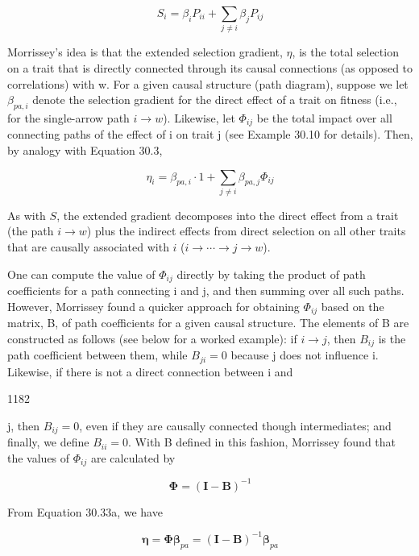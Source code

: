 \documentclass{article}
\begin{document}
\begin{equation}
S_{i}=\beta_{i}P_{ii}+\sum_{j\neq i}\beta_{j}P_{ij}
\end{equation}

Morrissey’s idea is that the extended selection gradient,  $ \eta $, is the total selection on a trait that is directly connected through its causal connections (as opposed to correlations) with w. For a given causal structure (path diagram), suppose we let  $ \beta_{pa,i} $ denote the selection gradient for the direct effect of a trait on fitness (i.e., for the single-arrow path  $ i \to w $). Likewise, let  $ \Phi_{ij} $ be the total impact over all connecting paths of the effect of i on trait j (see Example 30.10 for details). Then, by analogy with Equation 30.3,

\begin{equation}
\eta_{i}=\beta_{pa,i}\cdot1+\sum_{j\neq i}\beta_{pa,j}\Phi_{ij}
\tag{30.33a}
\label{eq:30_33a}
\end{equation}

As with $S$, the extended gradient decomposes into the direct effect from a trait (the path $i \to w$) plus the indirect effects from direct selection on all other traits that are causally associated with $i$ ($i \to \cdots \to j \to w$).

One can compute the value of  $ \Phi_{ij} $ directly by taking the product of path coefficients for a path connecting i and j, and then summing over all such paths. However, Morrissey found a quicker approach for obtaining  $ \Phi_{ij} $ based on the matrix, B, of path coefficients for a given causal structure. The elements of B are constructed as follows (see below for a worked example): if  $ i \rightarrow j $, then  $ B_{ij} $ is the path coefficient between them, while  $ B_{ji} = 0 $ because j does not influence i. Likewise, if there is not a direct connection between i and

1182

j, then  $ B_{ij} = 0 $, even if they are causally connected though intermediates; and finally, we define  $ B_{ii} = 0 $. With B defined in this fashion, Morrissey found that the values of  $ \Phi_{ij} $ are calculated by

\begin{equation}
\boldsymbol{\Phi}=(\mathbf{I}-\mathbf{B})^{-1}
\tag{30.33b}
\label{eq:30_33b}
\end{equation}

From Equation 30.33a, we have

\begin{equation}
\boldsymbol{\eta}=\boldsymbol{\Phi}\boldsymbol{\beta}_{pa}=(\mathbf{I}-\mathbf{B})^{-1}\boldsymbol{\beta}_{pa}
\tag{30.33c}
\label{eq:30_33c}
\end{equation}
\end{document}
